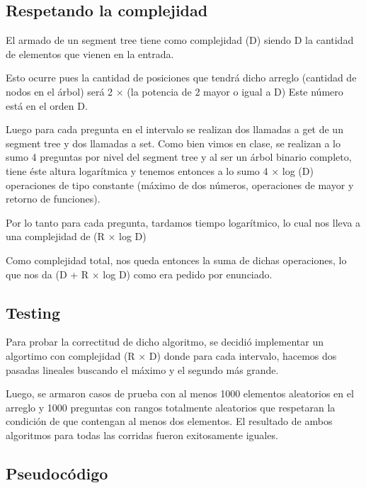 \subsection{Respetando la complejidad}

El armado de un segment tree tiene como complejidad \bigo(D) siendo D la cantidad de elementos que vienen en la entrada.\newline

Esto ocurre pues la cantidad de posiciones que tendrá dicho arreglo (cantidad de nodos en el árbol) será 2 $\times$ (la potencia de 2 mayor o igual a D) Este número está en el orden D. \newline

Luego para cada pregunta en el intervalo se realizan dos llamadas a get de un segment tree y dos llamadas a set. Como bien vimos en clase, se realizan a lo sumo 4 preguntas por nivel del segment tree y al ser un árbol binario completo, tiene éste altura logarítmica y tenemos entonces a lo sumo 4 $\times$ log (D) operaciones de tipo constante (máximo de dos números, operaciones de mayor y retorno de funciones).\newline

Por lo tanto para cada pregunta, tardamos tiempo logarítmico, lo cual nos lleva a una complejidad de \bigo(R $\times$ log D)  \newline 

Como complejidad total, nos queda entonces la suma de dichas operaciones, lo que nos da \bigo(D + R $\times$ log D) como era pedido por enunciado.

\subsection{Testing}

Para probar la correctitud de dicho algoritmo, se decidió implementar un algortimo con complejidad \bigo(R $\times$ D) donde para cada intervalo, hacemos dos pasadas lineales buscando el máximo y el segundo más grande. \newline

Luego, se armaron casos de prueba con al menos 1000 elementos aleatorios en el arreglo y 1000 preguntas con rangos totalmente aleatorios que respetaran la condición de que contengan al menos dos elementos. El resultado de ambos algoritmos para todas las corridas fueron exitosamente iguales.

\subsection{Pseudocódigo}


